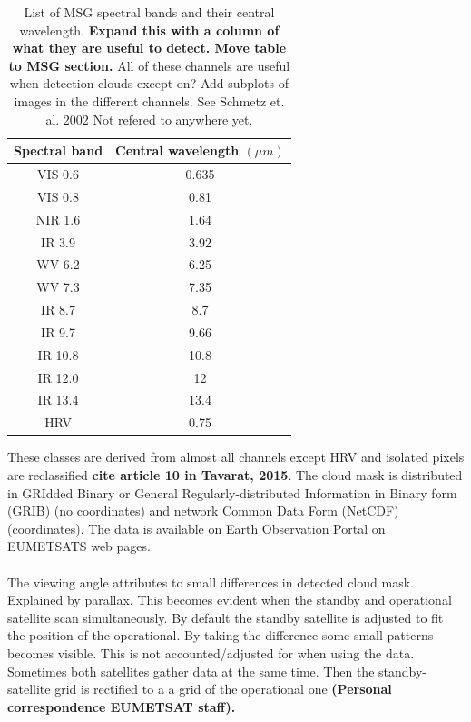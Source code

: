 \begin{table}[]
    \centering
    \begin{tabular}{c|c}
        Spectral band & Central wavelength $\left( \mu m  \right)$ \\ \hline
        VIS 0.6 & 0.635 \\
        VIS 0.8 & 0.81 \\
        NIR 1.6 & 1.64 \\
        IR 3.9 & 3.92 \\
        WV 6.2 & 6.25 \\
        WV 7.3 & 7.35 \\ 
        IR 8.7 & 8.7 \\
        IR 9.7 & 9.66 \\
        IR 10.8 & 10.8 \\
        IR 12.0 & 12 \\
        IR 13.4 & 13.4 \\
        HRV & 0.75
    \end{tabular}
    \caption{List of MSG spectral bands and their central wavelength. \textbf{Expand this with a column of what they are useful to detect. Move table to MSG section. } All of these channels are useful when detection clouds except on? Add subplots of images in the different channels. See Schmetz et. al. 2002  Not refered to anywhere yet.}
    \label{tab:msg_spectral_bands}
\end{table}
These classes are derived from almost all channels except HRV and isolated pixels are reclassified \textbf{cite article 10 in Tavarat, 2015}. The cloud mask is distributed in GRIdded Binary or General Regularly-distributed Information in Binary form (GRIB) (no coordinates) and network Common Data Form (NetCDF) (coordinates). The data is available on Earth Observation Portal on EUMETSATS web pages. 
\\ \\ 
The viewing angle attributes to small differences in detected cloud mask. Explained by parallax. This becomes evident when the standby and operational satellite scan simultaneously. By default the standby satellite is adjusted to fit the position of the operational. By taking the difference some small patterns becomes visible. This is not accounted/adjusted for when using the data. Sometimes both satellites gather data at the same time. Then the standby-satellite grid is rectified to a a grid of the operational one \textbf{(Personal correspondence EUMETSAT staff).} 

